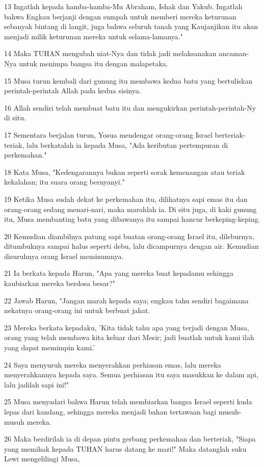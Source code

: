 \par 13 Ingatlah kepada hamba-hamba-Mu Abraham, Ishak dan Yakub. Ingatlah bahwa Engkau berjanji dengan sumpah untuk memberi mereka keturunan sebanyak bintang di langit, juga bahwa seluruh tanah yang Kaujanjikan itu akan menjadi milik keturunan mereka untuk selama-lamanya."
\par 14 Maka TUHAN mengubah niat-Nya dan tidak jadi melaksanakan ancaman-Nya untuk menimpa bangsa itu dengan malapetaka.
\par 15 Musa turun kembali dari gunung itu membawa kedua batu yang bertuliskan perintah-perintah Allah pada kedua sisinya.
\par 16 Allah sendiri telah membuat batu itu dan mengukirkan perintah-perintah-Ny di situ.
\par 17 Sementara berjalan turun, Yosua mendengar orang-orang Israel berteriak-teriak, lalu berkatalah ia kepada Musa, "Ada keributan pertempuran di perkemahan."
\par 18 Kata Musa, "Kedengarannya bukan seperti sorak kemenangan atau teriak kekalahan; itu suara orang bernyanyi."
\par 19 Ketika Musa sudah dekat ke perkemahan itu, dilihatnya sapi emas itu dan orang-orang sedang menari-nari, maka marahlah ia. Di situ juga, di kaki gunung itu, Musa membanting batu yang dibawanya itu sampai hancur berkeping-keping.
\par 20 Kemudian diambilnya patung sapi buatan orang-orang Israel itu, dileburnya, ditumbuknya sampai halus seperti debu, lalu dicampurnya dengan air. Kemudian disuruhnya orang Israel meminumnya.
\par 21 Ia berkata kepada Harun, "Apa yang mereka buat kepadamu sehingga kaubiarkan mereka berdosa besar?"
\par 22 Jawab Harun, "Jangan marah kepada saya; engkau tahu sendiri bagaimana nekatnya orang-orang ini untuk berbuat jahat.
\par 23 Mereka berkata kepadaku, 'Kita tidak tahu apa yang terjadi dengan Musa, orang yang telah membawa kita keluar dari Mesir; jadi buatlah untuk kami ilah yang dapat memimpin kami.'
\par 24 Saya menyuruh mereka menyerahkan perhiasan emas, lalu mereka menyerahkannya kepada saya. Semua perhiasan itu saya masukkan ke dalam api, lalu jadilah sapi ini!"
\par 25 Musa menyadari bahwa Harun telah membiarkan bangsa Israel seperti kuda lepas dari kandang, sehingga mereka menjadi bahan tertawaan bagi musuh-musuh mereka.
\par 26 Maka berdirilah ia di depan pintu gerbang perkemahan dan berteriak, "Siapa yang memihak kepada TUHAN harus datang ke mari!" Maka datanglah suku Lewi mengelilingi Musa,
